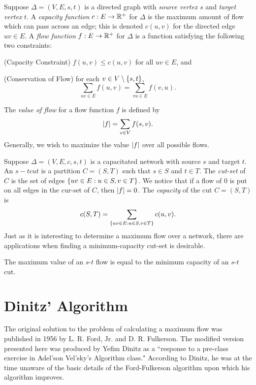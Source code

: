 \documentclass[m3380-lec-main.tex]{subfiles}
\begin{document}
\begin{defn} Suppose $\Delta = (V,E,s,t)$ is a directed graph with \emph{source vertex} $s$ and \emph{target vertex} $t$. A \emph{capacity function} $c:E\to\mathbb{R}^+$ for $\Delta$ is the maximum amount of flow which can pass across an edge; this is denoted $c(u,v)$ for the directed edge $uv\in E$. A \emph{flow function} $f:E\to \mathbb{R}^+$ for $\Delta$ is a function satisfying the following two constraints:
\begin{enum}
\item (Capacity Constraint) $f(u,v) \leq c(u,v)$ for all $uv\in E$, and
\item (Conservation of Flow) for each $v\in V\setminus\left\{s,t\right\}$, \[\sum_{uv\in E}f(u,v) = \sum_{vu\in E}f(v,u).\]
\end{enum}
The \emph{value of flow} for a flow function $f$ is defined by 
\[ \left|f\right| = \sum_{v\in V}f(s,v) .\]
Generally, we wish to maximize the value $\left|f\right|$ over all possible flows.
\end{defn}

\begin{defn} Suppose $\Delta = (V,E,c,s,t)$ is a capacitated network with source $s$ and target $t$. An $s-t cut$ is a partition $C=(S,T)$ such that $s\in S$ and $t\in T$. The \emph{cut-set} of $C$ is the set of edges $\left\{uv\in E:u\in S, v\in T\right\}$. We notice that if a flow of $0$ is put on all edges in the cur-set of $C$, then $\left|f\right|=0$. The \emph{capacity} of the cut $C=(S,T)$ is 
\[c(S,T) = \sum_{\left\{uv\in E: u\in S, v\in T\right\}}c(u,v). \]
Just as it is interesting to determine a maximum flow over a network, there are applications when finding a minimum-capacity cut-set is desirable.
\end{defn}

\begin{thm} The maximum value of an $s$-$t$ flow is equal to the minimum capacity of an $s$-$t$ cut.
\end{thm}

\section{Dinitz' Algorithm}
The original solution to the problem of calculating a maximum flow was published in 1956 by {L. R. Ford, Jr. and D. R. Fulkerson}. The modified version presented here was produced by Yefim Dinitz as a ``response to a pre-class exercise in Adel'son Vel'sky's Algorithm class." According to Dinitz, he was at the time unaware of the basic details of the Ford-Fulkerson algorithm upon which his algorithm improves.
\end{document}
